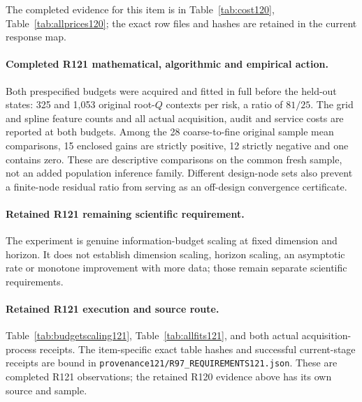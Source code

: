 The completed evidence for this item is in Table~\ref{tab:cost120}, Table~\ref{tab:allprices120}; the exact row files and hashes are retained in the current response map.

\paragraph{Completed R121 mathematical, algorithmic and empirical action.}
Both prespecified budgets were acquired and fitted in full before the held-out states: 325 and 1,053 original root-$Q$ contexts per risk, a ratio of $81/25$. The grid and spline feature counts and all actual acquisition, audit and service costs are reported at both budgets. Among the 28 coarse-to-fine original sample mean comparisons, 15 enclosed gains are strictly positive, 12 strictly negative and one contains zero. These are descriptive comparisons on the common fresh sample, not an added population inference family. Different design-node sets also prevent a finite-node residual ratio from serving as an off-design convergence certificate.

\paragraph{Retained R121 remaining scientific requirement.}
The experiment is genuine information-budget scaling at fixed dimension and horizon. It does not establish dimension scaling, horizon scaling, an asymptotic rate or monotone improvement with more data; those remain separate scientific requirements.

\paragraph{Retained R121 execution and source route.}
Table~\ref{tab:budgetscaling121}, Table~\ref{tab:allfits121}, and both actual acquisition-process receipts.
The item-specific exact table hashes and successful current-stage receipts are bound in \nolinkurl{provenance121/R97_REQUIREMENTS121.json}. These are completed R121 observations; the retained R120 evidence above has its own source and sample.
